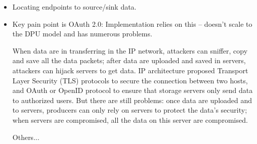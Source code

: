 \begin{itemize}
\item Locating endpoints to source/sink data.
\item Key pain point is OAuth 2.0:  Implementation relies on this – doesn’t scale to the DPU model and has numerous problems. 

When data are in transferring in the IP network, attackers can sniffer, copy and save all the data packets; after data are uploaded and saved in servers, attackers can hijack servers to get data. IP architecture proposed Transport Layer Security (TLS) protocols \cite{dierks2008transport} to secure the connection between two hosts, and OAuth or OpenID\cite{recordon2006openid} protocol to ensure that storage servers only send data to authorized users. But there are still problems: once data are uploaded and to servers, producers can only rely on servers to protect the data's security; when servers are compromised, all the data on this server are compromised. 

\item [Others...] 
\end{itemize}

